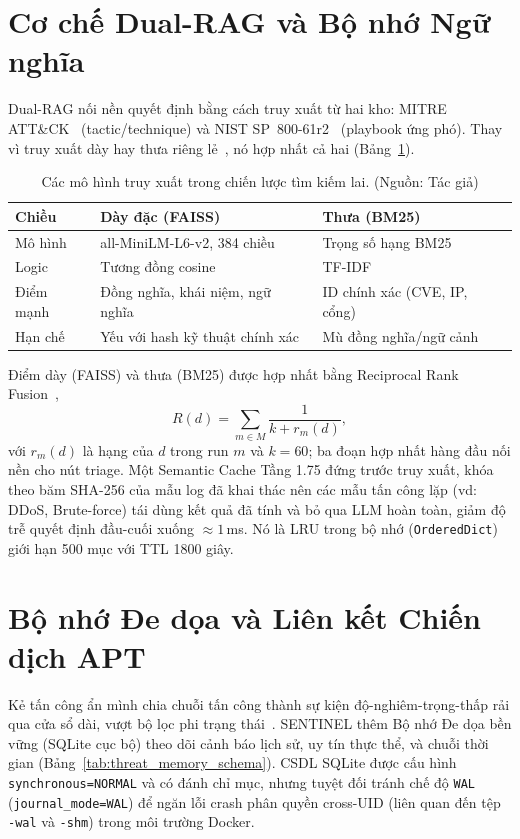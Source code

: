 \section{Cơ chế Dual-RAG và Bộ nhớ Ngữ nghĩa}
Dual-RAG nối nền quyết định bằng cách truy xuất từ hai kho: MITRE ATT\&CK~\cite{strom2018mitre} (tactic/technique) và NIST SP~800-61r2~\cite{nist80061} (playbook ứng phó). Thay vì truy xuất dày hay thưa riêng lẻ~\cite{rag2020}, nó hợp nhất cả hai (Bảng~\ref{tab:search_comparison}).

\begin{table}[!htbp]
    \centering
    \caption{Các mô hình truy xuất trong chiến lược tìm kiếm lai. (Nguồn: Tác giả)}
    \label{tab:search_comparison}
    \begin{tabular}{|>{\raggedright\arraybackslash}p{}|>{\raggedright\arraybackslash}p{}|>{\raggedright\arraybackslash}p{}|}
        \hline
        \textbf{Chiều} & \textbf{Dày đặc (FAISS)} & \textbf{Thưa (BM25)} \\
        \hline
        Mô hình & all-MiniLM-L6-v2, 384 chiều~\cite{reimers2019sentence} & Trọng số hạng BM25 \\ \hline
        Logic & Tương đồng cosine~\cite{faiss2019} & TF-IDF~\cite{bm25_2009} \\ \hline
        Điểm mạnh & Đồng nghĩa, khái niệm, ngữ nghĩa & ID chính xác (CVE, IP, cổng) \\ \hline
        Hạn chế & Yếu với hash kỹ thuật chính xác & Mù đồng nghĩa/ngữ cảnh \\ \hline
    \end{tabular}
\end{table}

Điểm dày (FAISS) và thưa (BM25) được hợp nhất bằng Reciprocal Rank Fusion~\cite{rrf2009},
\begin{equation}
    R(d) = \sum_{m \in M} \frac{1}{k + r_m(d)},
\end{equation}
với $r_m(d)$ là hạng của $d$ trong run $m$ và $k=60$; ba đoạn hợp nhất hàng đầu nối nền cho nút triage. Một Semantic Cache Tầng 1.75 đứng trước truy xuất, khóa theo băm SHA-256 của mẫu log đã khai thác nên các mẫu tấn công lặp (vd: DDoS, Brute-force) tái dùng kết quả đã tính và bỏ qua LLM hoàn toàn, giảm độ trễ quyết định đầu-cuối xuống $\approx\!1$\,ms. Nó là LRU trong bộ nhớ (\texttt{OrderedDict}) giới hạn 500 mục với TTL 1800 giây.

\section{Bộ nhớ Đe dọa và Liên kết Chiến dịch APT}
Kẻ tấn công ẩn mình chia chuỗi tấn công thành sự kiện độ-nghiêm-trọng-thấp rải qua cửa sổ dài, vượt bộ lọc phi trạng thái~\cite{apt_stealth2021}. SENTINEL thêm Bộ nhớ Đe dọa bền vững (SQLite cục bộ) theo dõi cảnh báo lịch sử, uy tín thực thể, và chuỗi thời gian (Bảng~\ref{tab:threat_memory_schema}). CSDL SQLite được cấu hình \texttt{synchronous=NORMAL} và có đánh chỉ mục, nhưng tuyệt đối tránh chế độ \texttt{WAL} (\texttt{journal\_mode=WAL}) để ngăn lỗi crash phân quyền cross-UID (liên quan đến tệp \texttt{-wal} và \texttt{-shm}) trong môi trường Docker.

